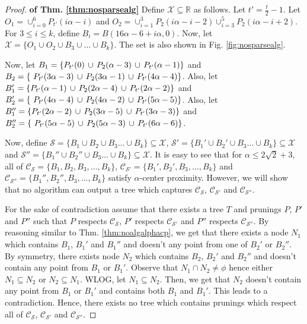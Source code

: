 \documentclass[anon,12pt]{colt2016} %
\newcommand{\mc}{\mathcal}
\begin{document}
\begin{proof}\textbf{ of Thm. \ref{thm:nosparsealg}}
Define $\mc X \subseteq \mathbb{R}$ as follows. Let $t' = \frac{t}{2}-1$. Let $O_1 = \cup_{i=0}^6 P_{t'}(i\alpha-i)$ and $O_2 = \cup_{i=1}^3 P_2(i\alpha-i-2) \cup_{i=3}^5 P_2(i\alpha-i+2)$. For $3\le i\le k$, define $B_i = B(16\alpha-6+i\alpha, 0)$. Now, let $\mc X = \{O_1 \cup O_2 \cup B_3 \cup \ldots \cup B_k\}$. The set is also shown in Fig. \ref{fig:nosparsealg}.

Now, let $B_1 = \{P_{t'}(0) \thinspace\cup\thinspace  P_{2}(\alpha-3) \thinspace\cup\thinspace P_{t'}(\alpha-1) \}$ and $B_2 = \{\ P_{t'}(3\alpha-3) \thinspace\cup\thinspace P_{2}(3\alpha-1)\thinspace\cup\thinspace P_{t'}(4\alpha-4)\}$. Also, let $B_1' = \{P_{t'}(\alpha-1) \thinspace\cup\thinspace  P_{2}(2\alpha-4) \thinspace\cup\thinspace P_{t'}(2\alpha-2) \}$ and $B_2' = \{\ P_{t'}(4\alpha-4) \thinspace\cup\thinspace P_{2}(4\alpha-2)\thinspace\cup\thinspace P_{t'}(5\alpha-5)\}$. Also, let $B_1'' = \{P_{t'}(2\alpha-2) \thinspace\cup\thinspace  P_{2}(3\alpha-5) \thinspace\cup\thinspace P_{t'}(3\alpha-3) \}$ and $B_2'' = \{\ P_{t'}(5\alpha-5) \thinspace\cup\thinspace P_{2}(5\alpha-3)\thinspace\cup\thinspace P_{t'}(6\alpha-6)\}$. 

Now, define $\mc S = \{B_1 \cup B_2 \cup B_3\ldots \cup B_k\} \subseteq \mc X$, $\mc S' = \{B_1' \cup B_2' \cup B_3\ldots \cup B_k\} \subseteq \mc X$ and $\mc S'' = \{B_1'' \cup B_2'' \cup B_3\ldots \cup B_k\} \subseteq \mc X$. It is easy to see that for $\alpha \le 2\sqrt{2} + 3$, all of $\mc C_{\mc S} = \{B_1, B_2, B_3, \ldots, B_k\}$, $\mc C_{\mc S'} = \{B_1', B_2', B_3, \ldots, B_k\}$ and $\mc C_{\mc S''} = \{B_1'', B_2'', B_3, \ldots, B_k\}$ satisfy $\alpha$-center proximity. However, we will show that no algorithm can output a tree which captures $\mc C_{\mc S}$, $\mc C_{\mc S'}$ and $\mc C_{\mc S''}$.

For the sake of contradiction assume that there exists a tree $T$ and prunings $P$, $P'$ and $P''$ such that $P$ respects $\mc C_{\mc S}$, $P'$ respects $\mc C_{\mc S'}$ and $P''$ respects $\mc C_{\mc S''}$. By reasoning similar to Thm. \ref{thm:noalgalphacp}, we get that there exists a node $N_1$ which contains $B_1$, $B_1'$ and $B_1''$ and doesn't any point from one of $B_2'$ or $B_2''$. By symmetry, there exists node $N_2$ which contains $B_2$, $B_2'$ and $B_2''$ and doesn't contain any point from $B_1$ or $B_1'$. Observe that $N_1 \cap N_2 \neq \phi$ hence either $N_1 \subseteq N_2$ or $N_2 \subseteq N_1$. WLOG, let $N_1 \subseteq N_2$. Then, we get that $N_2$ doesn't contain any point from $B_1$ or $B_1'$ and contains both $B_1$ and $B_1'$. This leads to a contradiction. Hence, there exists no tree which contains prunings which respect all of $\mc C_{\mc S}$, $\mc C_{\mc S'}$ and $\mc C_{\mc S''}$.
\end{proof}
\end{document}
